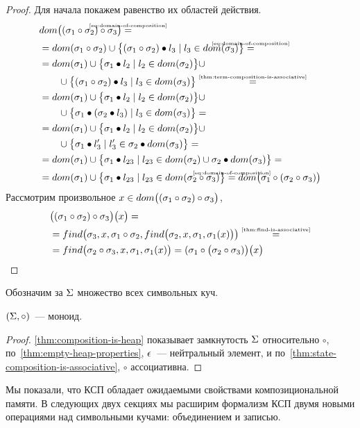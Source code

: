 \begin{proof}
Для начала покажем равенство их областей действия.
\begin{align*}
&\Dom{\compose{(\compose{\sigma_1}{\sigma_2})}{\sigma_3}}\eqbyref{eq:domain-of-composition}\\
&=\dom{\compose{\sigma_1}{\sigma_2}}\cup\big\{\fillterm{(\compose{\sigma_1}{\sigma_2})}{l_3} \mid l_3\in\dom{\sigma_3} \big\}\eqbyref{eq:domain-of-composition}\\
&= \dom{\sigma_1}\cup\big\{\fillterm{\sigma_1}{l_2} \mid l_2\in\dom{\sigma_2}\big\}\cup\\
&\qquad\cup\big\{\fillterm{(\compose{\sigma_1}{\sigma_2})}{l_3} \mid l_3\in\dom{\sigma_3}\big\}\eqby{\autoref{thm:term-composition-is-associative}}\\
&= \dom{\sigma_1}\cup\big\{\fillterm{\sigma_1}{l_2} \mid l_2\in\dom{\sigma_2}\big\}\cup\\
&\qquad\cup\big\{\fillterm{\sigma_1}{(\fillterm{\sigma_2}{l_3})} \mid l_3\in\dom{\sigma_3}\big\}=\\
&= \dom{\sigma_1}\cup\big\{\fillterm{\sigma_1}{l_2} \mid l_2\in\dom{\sigma_2}\big\}\cup\\
&\qquad\cup\big\{\fillterm{\sigma_1}{l_3'} \mid l_3'\in\fillterm{\sigma_2}{\dom{\sigma_3}}\big\}=\\
&= \dom{\sigma_1}\cup\big\{\fillterm{\sigma_1}{l_{23}} \mid l_{23}\in\dom{\sigma_2}\cup\fillterm{\sigma_2}{\dom{\sigma_3}}\big\}=\\
&= \dom{\sigma_1}\cup\big\{\fillterm{\sigma_1}{l_{23}} \mid l_{23}\in\dom{\compose{\sigma_2}{\sigma_3}}\big\}\eqbyref{eq:domain-of-composition}\Dom{\compose{\sigma_1}{(\compose{\sigma_2}{\sigma_3})}}
\end{align*}
%
Рассмотрим произвольное $x\in dom\big((\sigma_1\circ\sigma_2)\circ\sigma_3\big)$,
%
\begin{align*}\notag
&\big(\compose{(\compose{\sigma_1}{\sigma_2})}{\sigma_3}\big)\big(x\big)=\\
&=\finD{\sigma_3}{x}{\compose{\sigma_1}{\sigma_2}}{\finD{\sigma_2}{x}{\sigma_1}{\sigma_1(x)}}\eqby{\autoref{thm:find-is-associative}}\\
&=\finD{\compose{\sigma_2}{\sigma_3}}{x}{\sigma_1}{\sigma_1(x)}=(\compose{\sigma_1}{\big(\compose{\sigma_2}{\sigma_3})}\big)\big(x\big)
\end{align*}
\end{proof}
%
Обозначим за $\Sigma$ множество всех символьных куч.
%
\begin{thm}
$(\Sigma, \circ)$~--- моноид.
\end{thm}
\begin{proof}
\autoref{thm:composition-is-heap} показывает замкнутость $\Sigma$ относительно $\circ$, по~\autoref{thm:empty-heap-properties}, $\epsilon$~--- нейтральный элемент, и по~\autoref{thm:state-composition-is-associative}, $\circ$ ассоциативна.
\end{proof}
%
Мы показали, что КСП обладает ожидаемыми свойствами композициональной памяти. В следующих двух секциях мы расширим формализм КСП двумя новыми операциями над символьными кучами: объединением и записью.

